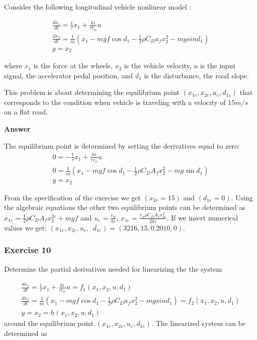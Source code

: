 Consider the following longitudinal vehicle nonlinear model : 

\begin{eqnarray}
\frac{d x_1}{dt} = \frac{1}{\tau}x_1 + \frac{ki}{\tau r_w}u \nonumber \\
\frac{d x_2}{dt} = \frac{1}{m} (x_1 - mgf\cos d_1 - \frac{1}{2}\rho C_D a_f x_{2}^2 - mgsin d_1 ) \nonumber \\
y = x_2 \nonumber
\end{eqnarray}

where $x_1$ is the force at the wheels, $x_2$ is the vehicle velocity, $u$ is the input signal, the accelerator pedal position, and $d_1$ is the disturbance, the road slope.

This problem is about determining the equilibrium point $(x_{1e}, x_{2e}, u_e, d_{1e})$ that corresponds to the condition when vehicle is traveling with a velocity of $15 m/s$ on a flat road.

\textbf{Answer}

The equilibrium point is determined by setting the derivatives equal to zero: 
\begin{eqnarray}
0 = -\frac{1}{\tau}x_1+\frac{ki}{\tau r_w}u \nonumber \\
0 =\frac{1}{m}\left ( x_1-mgf\cos{d_1}-\frac{1}{2}\rho C_D A_f x^2_2-mg\sin{d_1}\right ) \nonumber\\
y =x_2 \nonumber 
\end{eqnarray}

From the specification of the exercise we get $(x_{2e}=15)$ and $(d_{1e}=0)$. Using the algebraic equations the other two equilibrium points can be determined as $x_{1e}=\frac{1}{2}\rho C_D A_f x^{2e}_2+m g f$ and 
$u_{e}=\frac{r_w}{k i}$, $x_{1e}=\frac{r_w\rho C_D A_f x^2_{2e}}{2k i}$. If we insert numerical values we get: $(x_{1e},x_{2e},u_{e}, ~~d_{1e})=(3216, 15, 0.2010, 0)$.

\subsubsection{Exercise 10}

Determine the partial derivatives needed for linearizing the the system

\begin{eqnarray}
\frac{d x_1}{dt} = \frac{1}{\tau}x_1 + \frac{ki}{\tau r_w}u = f_1(x_1, x_2, u, d_1) \nonumber \\
\frac{d x_2}{dt} = \frac{1}{m} (x_1 - mgf\cos d_1 - \frac{1}{2}\rho C_D a_f x_{2}^2 - mgsin d_1 ) = f_2(x_1, x_2, u, d_1) \nonumber \\
y = x_2 = h(x_1, x_2, u, d_1) \nonumber
\end{eqnarray}
around the equilibrium point $(x_{1e}, x_{2e}, u_e, d_{1e})$. The linearized system can be determined as


